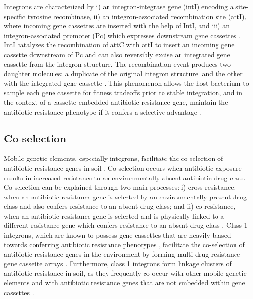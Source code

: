 Integrons are characterized by i) an integron-integrase gene (intI) encoding a site-specific tyrosine recombinase, ii) an integron-associated recombination site (attI), where incoming gene cassettes are inserted with the help of IntI, and iii) an integron-associated promoter (Pc) which expresses downstream gene cassettes \dummyfig \parencite{Gillings.2014}.
IntI catalyzes the recombination of attC with attI to insert an incoming gene cassette downstream of Pc and can also reversibly excise an integrated gene cassette from the integron structure.
The recombination event produces two daughter molecules: a duplicate of the original integron structure, and the other with the integrated gene cassette \parencite{Ghaly.2020}.
This phenomenon allows the host bacterium to sample each gene cassette for fitness tradeoffs prior to stable integration, and in the context of a cassette-embedded antibiotic resistance gene, maintain the antibiotic resistance phenotype if it confers a selective advantage \parencite{Ghaly.2020}.

\subsection{Co-selection}

Mobile genetic elements, especially integrons, facilitate the co-selection of antibiotic resistance genes in soil \parencite{Pal.2015}.
Co-selection occurs when antibiotic exposure results in increased resistance to an environmentally absent antibiotic drug class.
Co-selection can be explained through two main processes: i) cross-resistance, when an antibiotic resistance gene is selected by an environmentally present drug class and also confers resistance to an absent drug class; and ii) co-resistance, when an antibiotic resistance gene is selected and is physically linked to a different resistance gene which confers resistance to an absent drug class \parencite{Wales.2015} \dummyfig.
Class 1 integrons, which are known to possess gene cassettes that are heavily biased towards conferring antibiotic resistance phenotypes \parencite{Ghaly.2020, Yang.2021}, facilitate the co-selection of antibiotic resistance genes in the environment by forming multi-drug resistance gene cassette arrays \parencite{Naas.2001}.
Furthermore, class 1 integrons form linkage clusters of antibiotic resistance in soil, as they frequently co-occur with other mobile genetic elements and with antibiotic resistance genes that are not embedded within gene cassettes \parencite{Johnson.2016, Pal.2015}.

